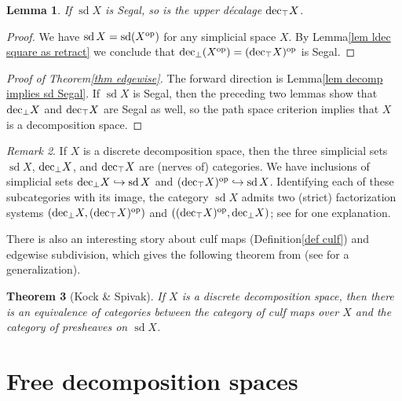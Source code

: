 \documentclass{amsart}
\newtheorem{theorem}{Theorem}[section]
\newtheorem{lemma}[theorem]{Lemma}
\theoremstyle{definition}
\theoremstyle{remark}
\newtheorem{remark}[theorem]{Remark}
\newcommand{\op}{\textup{op}}
\newcommand{\udec}{\textup{dec}_{\top}}
\newcommand{\ldec}{\textup{dec}_{\perp}}
\DeclareMathOperator{\sd}{sd}
\begin{document}
\begin{lemma}
If $\sd X$ is Segal, so is the upper d\'ecalage $\udec X$.
\end{lemma}
\begin{proof}
We have $\sd X = \sd (X^\op)$ for any simplicial space $X$. 
By Lemma\nobreakspace \ref {lem ldec square as retract} we conclude that $\ldec(X^\op) = (\udec X)^\op$ is Segal.
\end{proof}

\begin{proof}[Proof of Theorem\nobreakspace \ref {thm edgewise}]
The forward direction is Lemma\nobreakspace \ref {lem decomp implies sd Segal}.
If $\sd X$ is Segal, then the preceding two lemmas show that $\ldec X$ and $\udec X$ are Segal as well, so the path space criterion implies that $X$ is a decomposition space.
\end{proof}


\begin{remark}\label{rmk sd vs dec}
If $X$ is a discrete decomposition space, then the three simplicial sets $\sd X$, $\ldec X$, and $\udec X$ are (nerves of) categories.
We have inclusions of simplicial sets $\ldec X \hookrightarrow \sd X$ and $(\udec X)^\op \hookrightarrow \sd X$.
Identifying each of these subcategories with its image, the category $\sd X$ admits two (strict) factorization systems $(\ldec X, (\udec X)^\op)$ and $((\udec X)^\op, \ldec X)$; see \cite{Hackney:OC2SS} for one explanation.%
\end{remark}

There is also an interesting story about culf maps (Definition\nobreakspace \ref {def culf}) and edgewise subdivision, which gives the following theorem from \cite{KockSpivak:DSST} (see \cite{HackneyKock:CMES} for a generalization). 

\begin{theorem}[Kock \& Spivak]\label{thm kock spivak}
If $X$ is a discrete decomposition space, then there is an equivalence of categories between the category of culf maps over $X$ and the category of presheaves on $\sd X$.
\end{theorem}

\section{Free decomposition spaces}\label{sec free}
\end{document}
